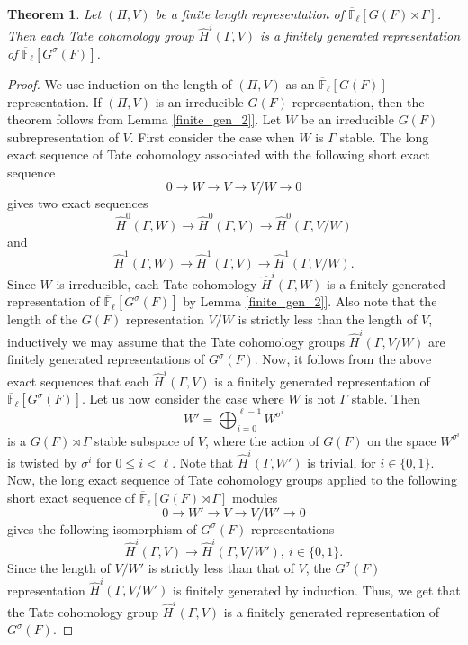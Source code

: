 \documentclass[10pt, reqno]{amsart}
\theoremstyle{plain}
\numberwithin{equation}{section} \newcommand{\di}{\operatorname{dim}}
\newtheorem{theorem}{Theorem}[subsection]
\begin{document}
\begin{theorem}\label{Tate_finite_gen}
Let $(\Pi, V)$ be a finite length
representation of
$\overline{\mathbb{F}}_\ell[G(F)\rtimes \Gamma]$. Then
each Tate cohomology group $\widehat{H}^i(\Gamma, V)$
is a finitely generated
representation of $\overline
{\mathbb{F}}_\ell[G^\sigma(F)]$.
\end{theorem}
\begin{proof}
We use induction on the length
of $(\Pi,V)$ as an $\overline{\mathbb{F}}_\ell[G(F)]$
representation. If
$(\Pi,V)$ is an irreducible
$G(F)$ representation, then
the theorem follows from Lemma
\ref{finite_gen_2]}. Let $W$
be an irreducible $G(F)$
subrepresentation of $V$. 
First consider the case when $W$ is $\Gamma$
stable. The long exact sequence of
Tate cohomology associated with the
following short exact sequence
$$ 0\longrightarrow W\longrightarrow V
\longrightarrow V/W\longrightarrow 0  $$
gives two exact sequences
$$ \widehat{H}^0(\Gamma, W)\longrightarrow
\widehat{H}^0(\Gamma, V)\longrightarrow
\widehat{H}^0(\Gamma, V/W) $$
and
$$ \widehat{H}^1(\Gamma, W)\longrightarrow
\widehat{H}^1(\Gamma, V)
\longrightarrow \widehat{H}^1(\Gamma, V/W). $$ 
Since $W$ is irreducible, each Tate cohomology
$\widehat{H}^i(\Gamma, W)$ is a finitely generated
representation of
$\overline{\mathbb{F}}_\ell[G^\sigma(F)]$ by Lemma
\ref{finite_gen_2]}. Also note that
the length of the $G(F)$ representation $V/W$ is strictly
less than the length of $V$, inductively we may assume that the
Tate cohomology groups $\widehat{H}^i(\Gamma, V/W)$
are finitely generated representations of $G^\sigma(F)$. Now,
it follows from the above exact
sequences that each $\widehat{H}^i(\Gamma, V)$
is a finitely generated representation of
$\overline{\mathbb{F}}_\ell[G^\sigma(F)]$.
Let us now consider the case where $W$ is not $\Gamma$ stable. Then
$$ W' = \bigoplus_{i=0}^{\ell-1} W^{\sigma^i} $$
is a $G(F)\rtimes\Gamma$
stable subspace of $V$, where
the action of $G(F)$ on the space
$W^{\sigma^i}$ is twisted by
$\sigma^i$ for  $0\leq i<\ell$. Note that 
$\widehat{H}^i(\Gamma, W')$ is
trivial, for $i\in \{0,1\}$. Now, the long exact
sequence of Tate cohomology groups applied 
to the following short exact sequence of
$\overline{\mathbb{F}}_\ell[G(F)\rtimes\Gamma]$ modules
$$ 0\longrightarrow W'\longrightarrow
V \longrightarrow V/W'\longrightarrow 0 $$ 
gives the following isomorphism of $G^\sigma(F)$ representations
$$ \widehat{H}^i(\Gamma, V)\rightarrow
\widehat{H}^i(\Gamma, V/W'),\ i\in \{0,1\}. $$
Since the length of $V/W'$ is
strictly less than that of $V$, the $G^\sigma(F)$
representation $\widehat{H}^i(\Gamma, V/W')$
is finitely generated by induction. Thus, we get that the Tate cohomology group
$\widehat{H}^i(\Gamma, V)$ is a finitely generated representation of 
$G^\sigma(F)$.
\end{proof}
\end{document}
